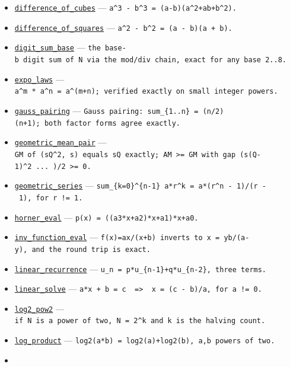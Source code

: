 \documentclass[
  10pt,
]{article}
\begin{document}
\begin{itemize}
\item
  \href{../generation_1/I1/algos_gen1_ext.py}{\texttt{difference\_of\_cubes}}
  --- \texttt{a\^{}3\ -\ b\^{}3\ =\ (a-b)(a\^{}2+ab+b\^{}2).}
\item
  \href{../tools/prm/algos.py}{\texttt{difference\_of\_squares}} ---
  \texttt{a\^{}2\ -\ b\^{}2\ =\ (a\ -\ b)(a\ +\ b).}
\item
  \href{../generation_1/I3/algos_i3.py}{\texttt{digit\_sum\_base}} ---
  \texttt{the\ base-b\ digit\ sum\ of\ N\ via\ the\ mod/div\ chain,\ exact\ for\ any\ base\ 2..8.}
\item
  \href{../generation_1/I3/algos_i3.py}{\texttt{expo\_laws}} ---
  \texttt{a\^{}m\ *\ a\^{}n\ =\ a\^{}(m+n);\ verified\ exactly\ on\ small\ integer\ powers.}
\item
  \href{../generation_1/I3/algos_i3.py}{\texttt{gauss\_pairing}} ---
  \texttt{Gauss\ pairing:\ sum\_\{1..n\}\ =\ (n/2)(n+1);\ both\ factor\ forms\ agree\ exactly.}
\item
  \href{../generation_1/I3/algos_i3.py}{\texttt{geometric\_mean\_pair}}
  ---
  \texttt{GM\ of\ (sQ\^{}2,\ s)\ equals\ sQ\ exactly;\ AM\ \textgreater{}=\ GM\ with\ gap\ (s(Q-1)\^{}2\ ...\ )/2\ \textgreater{}=\ 0.}
\item
  \href{../tools/prm/algos.py}{\texttt{geometric\_series}} ---
  \texttt{sum\_\{k=0\}\^{}\{n-1\}\ a*r\^{}k\ =\ a*(r\^{}n\ -\ 1)/(r\ -\ 1),\ for\ r\ !=\ 1.}
\item
  \href{../generation_1/I1/algos_gen1_ext.py}{\texttt{horner\_eval}} ---
  \texttt{p(x)\ =\ ((a3*x+a2)*x+a1)*x+a0.}
\item
  \href{../generation_1/I3/algos_i3.py}{\texttt{inv\_function\_eval}}
  ---
  \texttt{f(x)=ax/(x+b)\ inverts\ to\ x\ =\ yb/(a-y),\ and\ the\ round\ trip\ is\ exact.}
\item
  \href{../generation_1/I1/algos_gen1_big.py}{\texttt{linear\_recurrence}}
  --- \texttt{u\_n\ =\ p*u\_\{n-1\}+q*u\_\{n-2\},\ three\ terms.}
\item
  \href{../tools/prm/algos.py}{\texttt{linear\_solve}} ---
  \texttt{a*x\ +\ b\ =\ c\ \ =\textgreater{}\ \ x\ =\ (c\ -\ b)/a,\ for\ a\ !=\ 0.}
\item
  \href{../generation_1/I3/algos_i3.py}{\texttt{log2\_pow2}} ---
  \texttt{if\ N\ is\ a\ power\ of\ two,\ N\ =\ 2\^{}k\ and\ k\ is\ the\ halving\ count.}
\item
  \href{../generation_1/I1/algos_gen1_ext.py}{\texttt{log\_product}} ---
  \texttt{log2(a*b)\ =\ log2(a)+log2(b),\ a,b\ powers\ of\ two.}
\item

\end{itemize}
\end{document}
